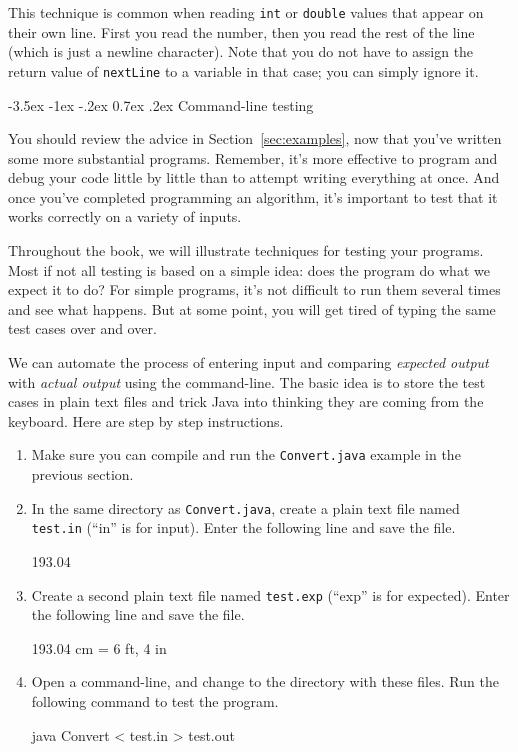 \documentclass[12pt]{book}
\makeatletter
\theoremstyle{exercise}
\newcommand{\java}[1]{\verb"#1"}
\renewcommand{\section}{\@startsection {section}{1}{\z@}%
    {-3.5ex \@plus -1ex \@minus -.2ex}%
    {0.7ex \@plus.2ex}%
    {\normalfont\Large\bfseries}}
\newcommand{\java}[1]{\lstinline{#1}} %
\makeatother
\begin{document}
This technique is common when reading \java{int} or \java{double} values that appear on their own line.
First you read the number, then you read the rest of the line (which is just a newline character).
Note that you do not have to assign the return value of \java{nextLine} to a variable in that case; you can simply ignore it.


\section{Command-line testing}

You should review the advice in Section~\ref{sec:examples}, now that you've written some more substantial programs.
Remember, it's more effective to program and debug your code little by little than to attempt writing everything at once.
And once you've completed programming an algorithm, it's important to test that it works correctly on a variety of inputs.

Throughout the book, we will illustrate techniques for testing your programs.
Most if not all testing is based on a simple idea: does the program do what we expect it to do?
For simple programs, it's not difficult to run them several times and see what happens.
But at some point, you will get tired of typing the same test cases over and over.

We can automate the process of entering input and comparing {\em expected output} with {\em actual output} using the command-line.
The basic idea is to store the test cases in plain text files and trick Java into thinking they are coming from the keyboard.
Here are step by step instructions.

\begin{enumerate}

\item Make sure you can compile and run the {\tt Convert.java} example in the previous section.

\item In the same directory as {\tt Convert.java}, create a plain text file named {\tt test.in} (``in'' is for input).
Enter the following line and save the file.

\begin{stdout}
193.04
\end{stdout}

\item Create a second plain text file named {\tt test.exp} (``exp'' is for expected).
Enter the following line and save the file.

\begin{stdout}
193.04 cm = 6 ft, 4 in
\end{stdout}

\item Open a command-line, and change to the directory with these files.
Run the following command to test the program.

\begin{stdout}
java Convert < test.in > test.out
\end{stdout}

\end{enumerate}
\end{document}
